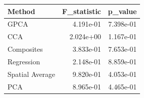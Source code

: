 \begin{tabular}{lrr}
\toprule
Method & F_statistic & p_value \\
\midrule
GPCA & 4.191e-01 & 7.398e-01 \\
CCA & 2.024e+00 & 1.167e-01 \\
Composites & 3.833e-01 & 7.653e-01 \\
Regression & 2.148e-01 & 8.859e-01 \\
Spatial Average & 9.820e-01 & 4.053e-01 \\
PCA & 8.965e-01 & 4.465e-01 \\
\bottomrule
\end{tabular}
